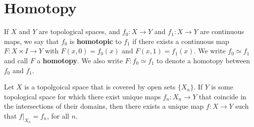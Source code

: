 
\section{Homotopy}

\begin{definition}
    If $X$ and  $Y$ are topological spaces, and  $f_0:X \xrightarrow{} Y$ and
    $f_1:X \xrightarrow{} Y$ are continuous maps, we say that $f_0$ is
    \textbf{homotopic} to $f_1$ if there exists a continuous map  $F:X \times I
    \xrightarrow{} Y$ with $F(x,0)=f_0(x)$ and $F(x,1)=f_1(x)$. We write $f_0
    \simeq f_1$ and call $F$ a  \textbf{homotopy}. We also write $F:f_0 \simeq
    f_1$ to denote a homotopy between $f_0$ and $f_1$.
\end{definition}

\begin{lemma}\label{2.1.1}
    Let $X$ is a topolgoical space that is covered by open sets  $\{X_n\}$. If
    $Y$ is some topological space for which there exist unique maps $f_n:X_n
    \xrightarrow{} Y$ that coincide in the intersections of their domains, then
    there exists a unique map $f:X \xrightarrow{} Y$ such that $f|_{X_n}=f_n$,
    for all $n$.
\end{lemma}

